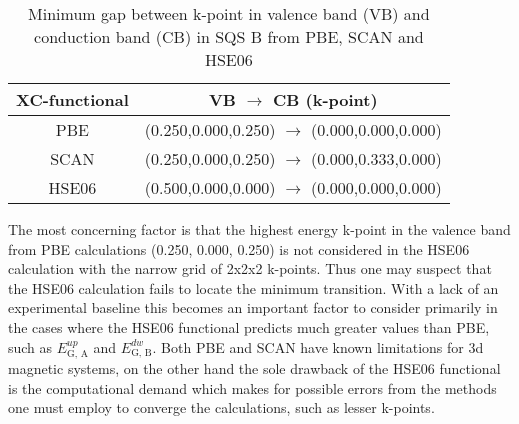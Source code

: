 \begin{table}[H]
\centering
\begin{tabular}{@{}cc@{}}
\toprule
XC-functional & VB $\rightarrow$ CB (k-point)                              \\ \midrule
PBE           & (0.250,0.000,0.250) $\rightarrow$ (0.000,0.000,0.000)  \\
SCAN          & (0.250,0.000,0.250) $\rightarrow$ (0.000,0.333,0.000)  \\
HSE06         & (0.500,0.000,0.000) $\rightarrow$ (0.000,0.000,0.000) \\ \bottomrule
\end{tabular}
\caption{Minimum gap between k-point in valence band (VB) and conduction band (CB) in SQS B from PBE, SCAN and HSE06}
\end{table}

The most concerning factor is that the highest energy k-point in the valence band from PBE calculations (0.250, 0.000, 0.250) is not considered in the HSE06 calculation with the narrow grid of 2x2x2 k-points. Thus one may suspect that the HSE06 calculation fails to locate the minimum transition. With a lack of an experimental baseline this becomes an important factor to consider primarily in the cases where the HSE06 functional predicts much greater values than PBE, such as $E_\text{G, A} ^{up}$ and $E_\text{G, B} ^{dw}$. Both PBE and SCAN have known limitations for 3d magnetic systems, on the other hand the sole drawback of the HSE06 functional is the computational demand which makes for possible errors from the methods one must employ to converge the calculations, such as lesser k-points. 

